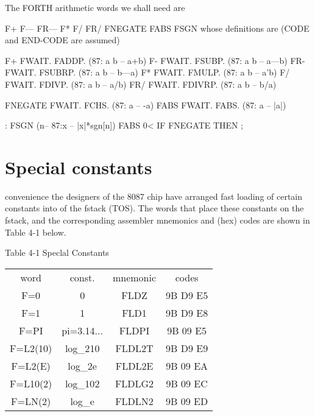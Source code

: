 {{{{The FORTH arithmetic words we shall need are

F+ F— FR— F* F/ FR/ FNEGATE FABS FSGN
whose definitions are (CODE and END-CODE are assumed)

\begin{listing}
    F+      FWAIT.    FADDP.    (87: a b -- a+b)
    F-      FWAIT.    FSUBP.    (87: a b -- a—b)
    FR-     FWAIT.    FSUBRP.   (87: a b -- b—a)
    F*      FWAIT.    FMULP.    (87: a b -- a'b)
    F/      FWAIT.    FDIVP.    (87: a b -- a/b)
    FR/     FWAIT.    FDIVRP.   (87: a b -- b/a)
\end{listing}

\begin{listing}
    FNEGATE FWAIT.  FCHS.   (87: a -- -a)
    FABS   FWAIT.   FABS.   (87: a -- |a|)

    : FSGN      (n-- 87:x -- |x|*sgn[n])
        FABS 0< IF FNEGATE THEN ;
\end{listing}

\section{Special constants}

 convenience the designers of the 8087 chip have arranged fast loading of certain constants into  of the fstack (TOS). The words that place these constants on the fstack, and the corresponding assembler mnemonics and (hex) codes are shown in Table 4-1 below.

Table 4-1 Speclal Constants
\begin{center}
    \begin{tabular}{|c c c c|}
        word      & const.      & mnemonic  & codes     \\
        F=0       & 0           & FLDZ      & 9B D9 E5  \\
        F=1       & 1           & FLD1      & 9B D9 E8  \\
        F=PI      & pi=3.14...  & FLDPI     & 9B 09 E5  \\
        F=L2(10)  & log_{2}10   & FLDL2T    & 9B D9 E9  \\ 
        F=L2(E)   & log_{2}e    & FLDL2E    & 9B 09 EA  \\
        F=L10(2)  & log_{10}2   & FLDLG2    & 9B 09 EC  \\
        F=LN(2)   & log_{e}     & FLDLN2    & 9B 09 ED  \\
    \end{tabular}
\end{center}

}}}}
